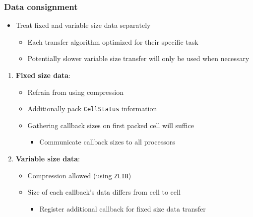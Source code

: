 




\begin{frame}
\frametitle{Data consignment}

\begin{itemize}
  \item Treat fixed and variable size data separately
  \begin{itemize}
    \item Each transfer algorithm optimized for their specific task
    \item Potentially slower variable size transfer will only be used when necessary
  \end{itemize}
\end{itemize}

\vfill{}

\begin{enumerate}
\item \textbf{Fixed size data}:
  \begin{itemize}
  \item Refrain from using compression
  \item Additionally pack \texttt{CellStatus} information
  \item Gathering callback sizes on first packed cell will suffice
    \begin{itemize}
    \item Communicate callback sizes to all processors
    \end{itemize}
  \end{itemize}
  \item \textbf{Variable size data}:
  \begin{itemize}
  \item Compression allowed (using \texttt{ZLIB})
  \item Size of each callback's data differs from cell to cell
    \begin{itemize}
    \item Register additional callback for fixed size data transfer
    \end{itemize}
  \end{itemize}
\end{enumerate}
\end{frame}





